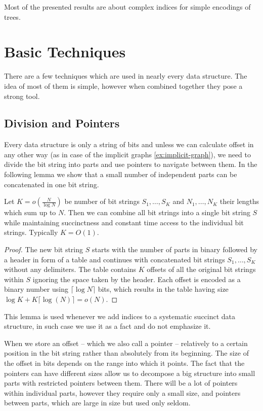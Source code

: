 \bigbreak

Most of the presented results are about complex indices for simple encodings of trees.

\section{Basic Techniques}

There are a few techniques which are used in nearly every data structure.
The idea of most of them is simple, however when combined together they pose a strong tool.

\subsection{Division and Pointers}

Every data structure is only a string of bits and unless we can calculate offset in any other way (as in case of the implicit graphs \ref{ex:implicit-graph}), we need to divide the bit string into parts and use pointers to navigate between them.
In the following lemma we show that a small number of independent parts can be concatenated in one bit string.

\begin{lemma}
	Let $K = o(\frac{N}{\log N})$ be number of bit strings $S_1, \ldots, S_K$ and $N_1, \dots, N_K$ their lengths which sum up to $N$.
	Then we can combine all bit strings into a single bit string $S$ while maintaining succinctness and constant time access to the individual bit strings.
	Typically $K = O(1)$.
\end{lemma}
\begin{proof}
	The new bit string $S$ starts with the number of parts in binary followed by a header in form of a table and continues with concatenated bit strings $S_1, \ldots, S_K$ without any delimiters.
	The table contains $K$ offsets of all the original bit strings within $S$ ignoring the space taken by the header.
	Each offset is encoded as a binary number using $\lceil \log N \rceil$ bits, which results in the table having size $\log K + K \lceil \log (N) \rceil = o(N)$.
\end{proof}

This lemma is used whenever we add indices to a systematic succinct data structure, in such case we use it as a fact and do not emphasize it.

When we store an offset -- which we also call a pointer -- relatively to a certain position in the bit string rather than absolutely from its beginning.
The size of the offset in bits depends on the range into which it points.
The fact that the pointers can have different sizes allow us to decompose a big structure into small parts with restricted pointers between them.
There will be a lot of pointers within individual parts, however they require only a small size, and pointers between parts, which are large in size but used only seldom.

